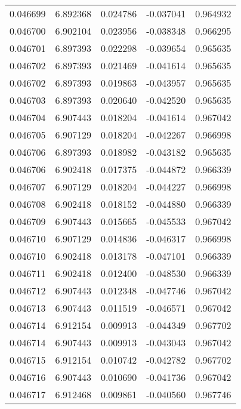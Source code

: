 \begin{tabular}{lrrrr}
0.046699    &  6.892368 &  0.024786 & -0.037041 &             0.964932 \\
0.046700    &  6.902104 &  0.023956 & -0.038348 &             0.966295 \\
0.046701    &  6.897393 &  0.022298 & -0.039654 &             0.965635 \\
0.046702    &  6.897393 &  0.021469 & -0.041614 &             0.965635 \\
0.046702    &  6.897393 &  0.019863 & -0.043957 &             0.965635 \\
0.046703    &  6.897393 &  0.020640 & -0.042520 &             0.965635 \\
0.046704    &  6.907443 &  0.018204 & -0.041614 &             0.967042 \\
0.046705    &  6.907129 &  0.018204 & -0.042267 &             0.966998 \\
0.046706    &  6.897393 &  0.018982 & -0.043182 &             0.965635 \\
0.046706    &  6.902418 &  0.017375 & -0.044872 &             0.966339 \\
0.046707    &  6.907129 &  0.018204 & -0.044227 &             0.966998 \\
0.046708    &  6.902418 &  0.018152 & -0.044880 &             0.966339 \\
0.046709    &  6.907443 &  0.015665 & -0.045533 &             0.967042 \\
0.046710    &  6.907129 &  0.014836 & -0.046317 &             0.966998 \\
0.046710    &  6.902418 &  0.013178 & -0.047101 &             0.966339 \\
0.046711    &  6.902418 &  0.012400 & -0.048530 &             0.966339 \\
0.046712    &  6.907443 &  0.012348 & -0.047746 &             0.967042 \\
0.046713    &  6.907443 &  0.011519 & -0.046571 &             0.967042 \\
0.046714    &  6.912154 &  0.009913 & -0.044349 &             0.967702 \\
0.046714    &  6.907443 &  0.009913 & -0.043043 &             0.967042 \\
0.046715    &  6.912154 &  0.010742 & -0.042782 &             0.967702 \\
0.046716    &  6.907443 &  0.010690 & -0.041736 &             0.967042 \\
0.046717    &  6.912468 &  0.009861 & -0.040560 &             0.967746 \\

\end{tabular}
